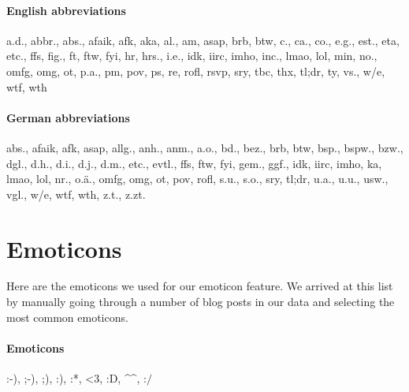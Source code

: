 \paragraph{English abbreviations}
a.d., abbr., abs., afaik, afk, aka, al., am, asap, brb, btw, c., ca., co., e.g., est., eta, etc., ffs, fig., ft, ftw, fyi, hr, hrs., i.e., idk, iirc, imho, inc., lmao, lol, min, no., omfg, omg, ot, p.a., pm, pov, ps, re, rofl, rsvp, sry, tbc, thx, tl;dr, ty, vs., w/e, wtf, wth


\paragraph{German abbreviations}
abs., afaik, afk, asap, allg., anh., anm., a.o., bd., bez., brb, btw, bsp., bspw., bzw., dgl., d.h., d.i., d.j., d.m., etc., evtl., ffs, ftw, fyi, gem., ggf., idk, iirc, imho, ka, lmao, lol, nr., o.ä., omfg, omg, ot, pov, rofl, s.u., s.o., sry, tl;dr, u.a., u.u., usw., vgl., w/e, wtf, wth, z.t., z.zt.

\section{Emoticons}
\label{sec:app_emoticons}
Here are the emoticons we used for our emoticon feature. We arrived at this list by manually going through a number of blog posts in our data and selecting the most common emoticons.


\paragraph{Emoticons}
:-), ;-), ;), :), :*, <3, :D, \textasciicircum\textasciicircum, :$/$